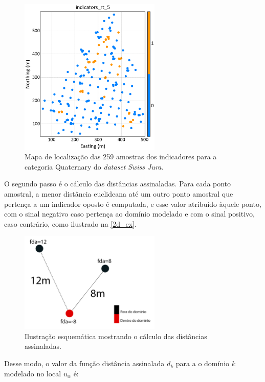 \begin{figure}[H]
	\centering
	\caption{\label{ind_5}Mapa de localização das 259 amostras dos indicadores para a categoria Quaternary do \textit{dataset} \textit{Swiss Jura}.}
	\includegraphics[width=0.6\textwidth]{capitulo_2/imagens/ind5.png}
\end{figure}

O segundo passo é o cálculo das distâncias assinaladas. Para cada ponto amostral, a menor distância euclideana até um outro ponto amostral que pertença a um indicador oposto é computada, e esse valor atribuído àquele ponto, com o sinal negativo caso pertença ao domínio modelado e com o sinal positivo, caso contrário, como ilustrado na \autoref{2d_ex}. 

\begin{figure}[H]
    \centering
	\caption{\label{2d_ex}Ilustração esquemática mostrando o cálculo das distâncias assinaladas.}
	\includegraphics[width=0.6\textwidth]{capitulo_2/imagens/2d_ex.jpg}
\end{figure}

Desse modo, o valor da função distância assinalada $d_k$ para a o domínio $k$ modelado no local $u_\alpha$ é:

